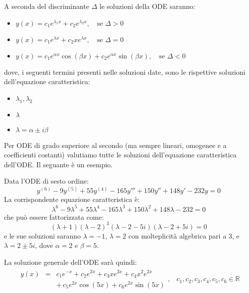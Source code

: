 \documentclass[a4paper,11pt]{article}
\begin{document}
A seconda del discriminante $\Delta$ le soluzioni della ODE saranno:
\begin{itemize}
    \item $y(x) = c_1e^{\lambda_1x} + c_2e^{\lambda_2x}, \quad \text{se } \Delta > 0$
    \item $y(x) = c_1e^{\lambda x} + c_2xe^{\lambda x}, \quad \text{se } \Delta = 0$
    \item $y(x) = c_1e^{\alpha x}\cos(\beta x) + c_2e^{\alpha x}\sin(\beta x), \quad \text{se } \Delta < 0 \quad$
\end{itemize}
dove, i seguenti termini presenti nelle soluzioni date, sono le rispettive soluzioni dell'equazione caratteristica:
\begin{itemize}
    \item $\lambda_1, \lambda_2$
    \item $\lambda$
    \item $\lambda = \alpha \pm i\beta$
\end{itemize}
Per ODE di grado superiore al secondo (ma sempre lineari, omogenee e a coefficienti costanti) valutiamo tutte le soluzioni dell'equazione caratteristica dell'ODE. Il seguante è un esempio.

\noindent Data l'ODE di sesto ordine:
\begin{equation*}
    y^{(6)}-9y^{(5)}+55y^{(4)}-165y'''+150y''+148y'-232y=0
\end{equation*}
La corrispondente equazione caratteristica è:
\begin{equation*}
    \lambda^6-9\lambda^5+55\lambda^4-165\lambda^3+150\lambda^2+148\lambda-232=0
\end{equation*}
che può essere fattorizzata come:
\begin{equation*}
    (\lambda+1)(\lambda-2)^3(\lambda-2-5i)(\lambda-2+5i) = 0
\end{equation*}
e le sue soluzioni saranno $\lambda = -1$, $\lambda = 2$ con molteplicità algebrica pari a 3, e $\lambda = 2\pm5i$, dove $\alpha = 2$ e $\beta = 5$.

\noindent La soluzione generale dell'ODE sarà quindi:
\begin{equation*}
    \begin{array}{rl}
        \begin{array}{rcl}
        y(x) & = & c_1e^{-x} + c_2e^{2x} + c_3xe^{2x} + c_4x^2e^{2x}\\
        && +\, c_5e^{2x}\cos(5x) + c_6e^{2x}\sin(5x)
        \end{array},
        & c_1, c_2, c_3, c_4, c_5, c_6 \in \mathbb{R}
    \end{array}
\end{equation*}
\end{document}
